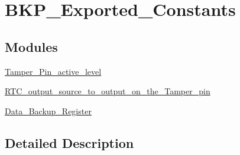 \hypertarget{group___b_k_p___exported___constants}{}\section{B\+K\+P\+\_\+\+Exported\+\_\+\+Constants}
\label{group___b_k_p___exported___constants}
\subsection*{Modules}
\begin{DoxyCompactItemize}
\item 
\mbox{\hyperlink{group___tamper___pin__active__level}{Tamper\+\_\+\+Pin\+\_\+active\+\_\+level}}
\item 
\mbox{\hyperlink{group___r_t_c__output__source__to__output__on__the___tamper__pin}{R\+T\+C\+\_\+output\+\_\+source\+\_\+to\+\_\+output\+\_\+on\+\_\+the\+\_\+\+Tamper\+\_\+pin}}
\item 
\mbox{\hyperlink{group___data___backup___register}{Data\+\_\+\+Backup\+\_\+\+Register}}
\end{DoxyCompactItemize}


\subsection{Detailed Description}
